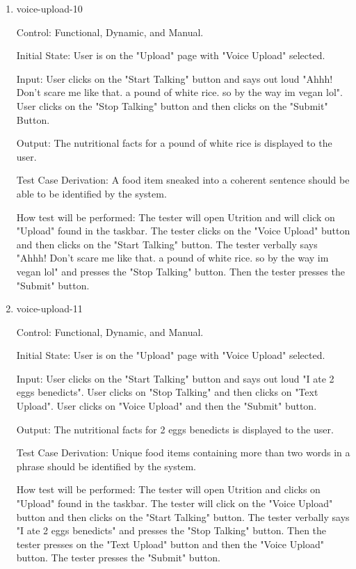 \documentclass[12pt, titlepage]{article}
\begin{document}
\begin{enumerate}
	\item{voice-upload-10\\}
	
	Control: Functional, Dynamic, and Manual.
	
	Initial State: User is on the "Upload" page with "Voice Upload" selected.
	
	Input: User clicks on the "Start Talking" button and says out loud "Ahhh! Don't scare me like that. a pound of white rice. so by the way im vegan lol". User clicks on the "Stop Talking" button and then clicks on the "Submit" Button.
	
	Output: The nutritional facts for a pound of white rice is displayed to the user.
	
	Test Case Derivation: A food item sneaked into a coherent sentence should be able to be identified by the system. 
	
	How test will be performed: The tester will open Utrition and will click on "Upload" found in the taskbar. The tester clicks on the "Voice Upload" button and then clicks on the "Start Talking" button. The tester verbally says "Ahhh! Don't scare me like that. a pound of white rice. so by the way im vegan lol" and presses the "Stop Talking" button. Then the tester presses the "Submit" button.
	
	\item{voice-upload-11\\}
	
	Control: Functional, Dynamic, and Manual.
	
	Initial State: User is on the "Upload" page with "Voice Upload" selected.
	
	Input: User clicks on the "Start Talking" button and says out loud "I ate 2 eggs benedicts". User clicks on "Stop Talking" and then clicks on "Text Upload". User clicks on "Voice Upload" and then the "Submit" button.
	
	Output: The nutritional facts for 2 eggs benedicts is displayed to the user.
	
	Test Case Derivation: Unique food items containing more than two words in a phrase should be identified by the system.
	
	How test will be performed: The tester will open Utrition and clicks on "Upload" found in the taskbar. The tester will click on the "Voice Upload" button and then clicks on the "Start Talking" button. The tester verbally says "I ate 2 eggs benedicts" and presses the "Stop Talking" button. Then the tester presses on the "Text Upload" button and then the "Voice Upload" button. The tester presses the "Submit" button.
	

\end{enumerate}
\end{document}
